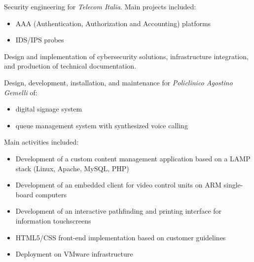 \vspace{3mm}
        {Security engineering for \emph{Telecom Italia}. Main projects included:
          \begin{itemize}
          \item AAA (Authentication, Authorization and Accounting) platforms
          \item IDS/IPS probes
        \end{itemize}
          Design and implementation of cybersecurity solutions, infrastructure integration, and production of technical documentation.}
\vspace{3mm}
        {Design, development, installation, and maintenance for \emph{Policlinico Agostino Gemelli} of:
          \begin{itemize}
          \item digital signage system
          \item queue management system with synthesized voice calling
          \end{itemize}
          Main activities included:
          \begin{itemize}
          \item Development of a custom content management application based on a LAMP stack (Linux, Apache, MySQL, PHP)
          \item Development of an embedded client for video control units on ARM single-board computers
          \item Development of an interactive pathfinding and printing interface for information touchscreens
          \item HTML5/CSS front-end implementation based on customer guidelines
          \item Deployment on VMware infrastructure
          \end{itemize}}
\vspace{3mm}
